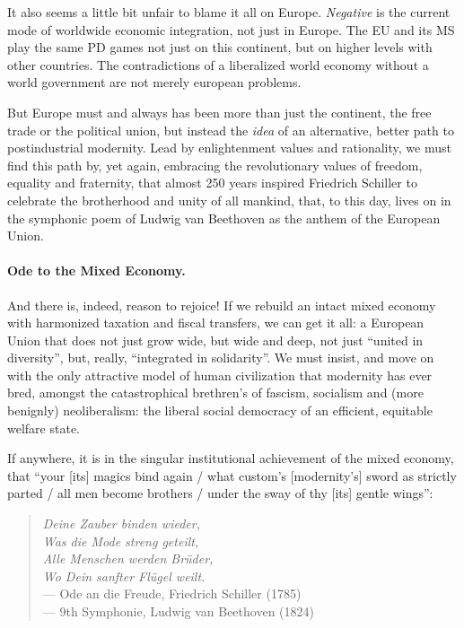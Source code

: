 It also seems a little bit unfair to blame it all on Europe.
\emph{Negative} is the current mode of worldwide economic integration, not just in Europe.
The \gls{EU} and its \gls{MS} play the same \gls{PD} games not just on this continent, but on higher levels with other countries.
The contradictions of a liberalized world economy without a world government are not merely european problems.

But Europe must and always has been more than just the continent, the free trade or the political union, but instead the \emph{idea} of an alternative, better path to postindustrial modernity.
Lead by enlightenment values and rationality, we must find this path by, yet again, embracing the revolutionary values of freedom, equality and fraternity, that almost 250 years inspired Friedrich Schiller to celebrate the brotherhood and unity of all mankind, that, to this day, lives on in the symphonic poem of Ludwig van Beethoven as the anthem of the European Union.

\paragraph{Ode to the Mixed Economy.} And there is, indeed, reason to rejoice! If we rebuild an intact mixed economy with harmonized taxation and fiscal transfers, we can get it all:
a European Union that does not just grow wide, but wide and deep, not just ``united in diversity'', but, really, ``integrated in solidarity''.
We must insist, and move on with the only attractive model of human civilization that modernity has ever bred, amongst the catastrophical brethren's of fascism, socialism and (more benignly) neoliberalism:
the liberal social democracy of an efficient, equitable welfare state.

If anywhere, it is in the singular institutional achievement of the mixed economy, that ``your [its] magics bind again / what custom's [modernity's] sword as strictly parted / all men become brothers / under the sway of thy [its] gentle wings'':
\begin{verse}
	\emph{Deine Zauber binden wieder,}\\
	\emph{Was die Mode streng geteilt,}\\
	\emph{Alle Menschen werden Br\"{u}der,}\\
	\emph{Wo Dein sanfter Fl\"{u}gel weilt.}\\
	--- Ode an die Freude, Friedrich Schiller (1785)\\
	--- 9th Symphonie, Ludwig van Beethoven (1824)
\end{verse}

